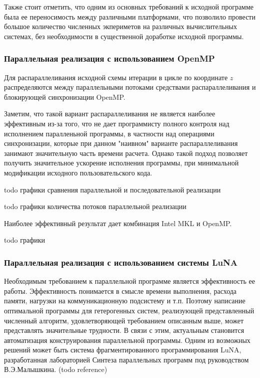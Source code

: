 Также стоит отметить, что одним из основных требований к исходной программе была ее переносимость между различными платформами,
что позволило провести большое количество численных экпериметов на различных вычислительных системах,
без необходимости в существенной доработке исходной программы.

\subsubsection{Параллельная реализация с использованием OpenMP}

Для распараллеливания исходной схемы итерации в цикле по координате $z$ распределяются между параллельными потоками средствами распараллеливания и блокирующей синхронизации OpenMP.

Заметим, что такой вариант распараллеливания не является наиболее эффективным из-за того, что не дает программисту полного контроля
над исполнением паралленьной программы, в частности над операциями синхронизации, которые при данном "наивном" варианте распараллеливания
занимают значительную часть времени расчета. Однако такой подход позволяет получить значительное ускорение исполнения программы,
при минимальной модификации исходного пользовательского кода.


todo графики сравнения параллельной и последовательной реализации

todo графики количества потоков параллельной реализации

Наиболее эффективный результат дает комбинация Intel MKL и OpenMP.

todo графики

\subsubsection{Параллельная реализация с использованием системы LuNA}

Необходимым требованием к параллельной программе является эффективность ее работы. Эффективность понимается в смысле времени выполнения,
расхода памяти, нагрузки на коммуникационную подсистему и т.п.
Поэтому написание оптимальной программы для гетерогенных систем, реализующей представленный численный алгоритм,
удовлетворяющей требованием описанным выше, может представлять значительные трудности.
В связи с этим, актуальным становится автоматизация конструирования параллельной программы.
Одним из возможных решений может быть система фрагментированного программирования LuNA,
разработанная лабораторией Синтеза параллельных программ под руководством В.Э.Малышкина. (todo reference)

